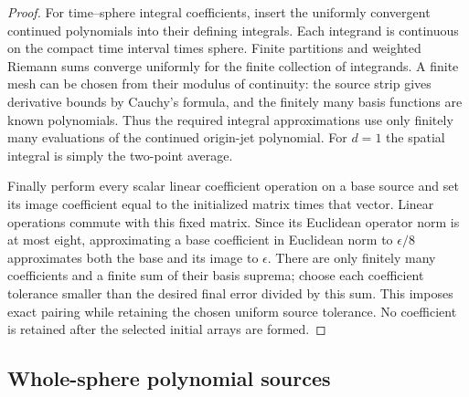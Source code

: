 \begin{proof}
For time--sphere integral coefficients, insert the uniformly convergent
continued polynomials into their defining integrals. Each integrand is
continuous on the compact time interval times sphere. Finite partitions
and weighted Riemann sums converge uniformly for the finite collection
of integrands. A finite mesh can be chosen from their modulus of
continuity: the source strip gives derivative bounds by Cauchy's
formula, and the finitely many basis functions are known polynomials.
Thus the required integral approximations use only finitely many
evaluations of the continued origin-jet polynomial. For $d=1$ the
spatial integral is simply the two-point average.

Finally perform every scalar linear coefficient operation on a base
source and set its image coefficient equal to the initialized matrix
times that vector. Linear operations commute with this fixed matrix.
Since its Euclidean operator norm is at most eight, approximating a
base coefficient in Euclidean norm to $\epsilon/8$ approximates both
the base and its image to $\epsilon$. There are only finitely many
coefficients and a finite sum of their basis suprema; choose each
coefficient tolerance smaller than the desired final error divided
by this sum. This imposes exact pairing while retaining the chosen
uniform source tolerance. No coefficient is retained after the
selected initial arrays are formed.
\end{proof}

\subsection{Whole-sphere polynomial sources}

